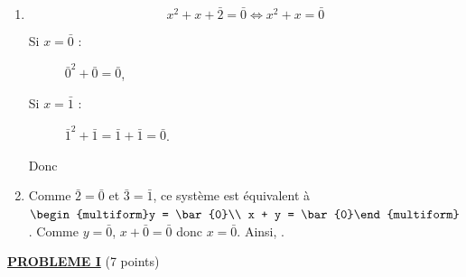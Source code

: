 \begin{description}
\begin{enumerate}
\begin{enumerate}
\[\begin{array}{|c|c|c|}
											\end{array}
										\]
							\item {}
										\[
											x^2 + x + \bar{2} = \bar{0}	\iff x^2 + x = \bar{0}
										\]
										\begin{description}
											\item[Si $x = \bar{0}$ : ] $\bar{0}^2 + \bar{0} = \bar{0}$,
											\item[Si $x = \bar{1}$ : ] $\bar{1}^2 + \bar{1} = \bar{1} + \bar{1} = \bar{0}$.
										\end{description}
									Donc 
							\item {}
									Comme $\bar{2} = \bar{0}$ et $\bar{3} = \bar{1}$, ce syst\`eme est \'equivalent \`a 
									$\begin{multiform}y = \bar{0}\\ x + y = \bar{0}\end{multiform}$.
									Comme $y=\bar{0}$, $x + \bar{0}= \bar{0}$ donc $x = \bar{0}$.
									Ainsi, .
						\end{enumerate}
			\end{enumerate}
	\end{description}
\noindent \underline{\textsc{\textbf{PROBLEME I}}} (7 points) \newline
